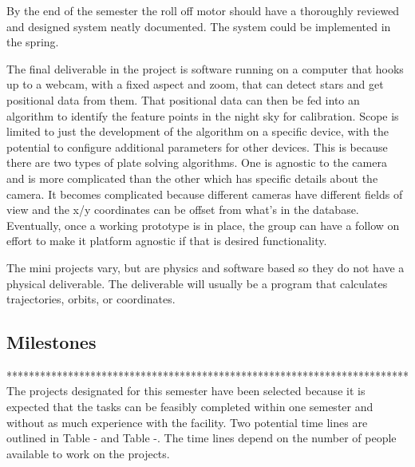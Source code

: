 \documentclass[conference]{IEEEtran} %
\begin{document}
By the end of the semester the roll off motor should have a thoroughly reviewed and designed system neatly documented. The system could be implemented in the spring. 

The final deliverable in the project is software running on a computer that hooks up to a webcam, with a fixed aspect and zoom, that can detect stars and get positional data from them.  That positional data can then be fed into an algorithm to identify the feature points in the night sky for calibration.  Scope is limited to just the development of the algorithm on a specific device, with the potential to configure additional parameters for other devices.  This is because there are two types of plate solving algorithms.  One is agnostic to the camera and is more complicated than the other which has specific details about the camera.  It becomes complicated because different cameras have different fields of view and the x/y coordinates can be offset from what's in the database.  Eventually, once a working prototype is in place, the group can have a follow on effort to make it platform agnostic if that is desired functionality.

The mini projects vary, but are physics and software based so they do not have a physical deliverable. The deliverable will usually be a program that calculates trajectories, orbits, or coordinates.




\subsection{Milestones}
\label{subsec:milestones}
  ************************************************************************
The projects designated for this semester have been selected because it is expected that the tasks can be feasibly completed within one semester and without as much experience with the facility. Two potential time lines are outlined in Table - and Table -. The time lines depend on the number of people available to work on the projects.
\end{document}
